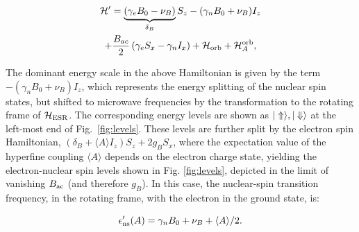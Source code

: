 \begin{multline} \label{eq:H_nsRot}
\mathcal{H}'=\underbrace{\left(\gamma_e B_0 - \nu_B\right)}_{\delta_B}S_z-(\gamma_nB_0+\nu_B)I_z\\
+\frac{B_{ac}}{2}\left(\gamma_eS_x-\gamma_nI_x\right)+\mathcal{H}_{\rm orb}+\mathcal{H}_A^{\rm orb},
\end{multline}

The dominant energy scale in the above Hamiltonian is given by the term $-(\gamma_nB_0+\nu_B)I_z$, which represents the energy splitting of the nuclear spin states, but shifted to microwave frequencies by the transformation to the rotating frame of $\mathcal{H}_{\rm ESR}$. The corresponding energy levels are shown as $|\Uparrow\rangle, |\Downarrow\rangle$ at the left-most end of Fig.~\ref{fig:levels}. These levels are further split by the electron spin Hamiltonian, $\left(\delta_B+\langle A\rangle I_z\right)S_z+2g_BS_x$, where the expectation value of the hyperfine coupling $\langle A\rangle$ depends on the electron charge state, yielding the electron-nuclear spin levels shown in Fig. \ref{fig:levels}, depicted in the limit of vanishing $B_{\rm ac}$ (and therefore $g_B$). In this case, the nuclear-spin transition frequency, in the rotating frame, with the electron in the ground state, is:

\begin{equation} \label{eq:e_ns}
\epsilon'_{\rm ns}(A) = \gamma_nB_0 + \nu_B + \langle A\rangle/2.
\end{equation}

